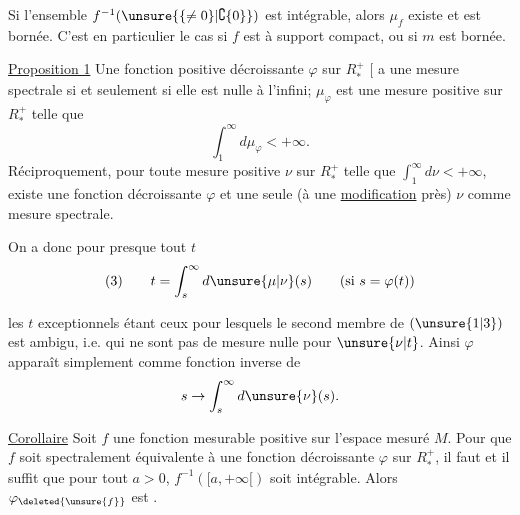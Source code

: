  Si l'ensemble \(f^{-1}(\unsure{\{\ne0\}|\complement\{0\}})\) est intégrable, alors \(\mu_f\) existe et est bornée. C'est en particulier le cas si \(f\) est à support compact, ou si \(m\) est bornée.
\inserted{\unsure{Autre cas : toute} \(f\in C_0(M)\), \unsure{plus généralement telle} que, \deleted{\(\unsure{\varepsilon}\)} pour tout \(\varepsilon\), \(|f|^{-1}(]\varepsilon,\infty[)\) est intégrable.}

\uline{Proposition 1}  Une fonction positive décroissante \(\varphi\) sur \(R_*^+\) \(\bigl[\) a une mesure spectrale si et seulement si elle est nulle à l'infini; \(\mu_\varphi\) est une mesure positive sur \(R_*^+\) telle que
\[
\int_1^\infty d\mu_\varphi<+\infty.
\]
Réciproquement, pour toute mesure positive \(\nu\) sur \(R_*^+\) telle que \(\int_1^\infty d\nu<+\infty\), existe une fonction  décroissante \(\varphi\) et une seule (à une \uline{modification}  près)  \(\nu\) comme mesure spectrale.

On a donc pour presque tout \(t\)
\[
(3)\qquad t=\int_s^\infty d\unsure{\mu|\nu}(s)\qquad(\text{si }s=\varphi(t))
\]


les \(t\) exceptionnels étant ceux pour lesquels le second membre de \((\unsure{1|3})\) est ambigu, i.e. qui ne sont pas de mesure nulle pour \(\unsure{\nu|t}\). Ainsi \(\varphi\) apparaît simplement comme fonction inverse de
\[
s\to\int_s^\infty d\unsure{\nu}(s).
\]

\uline{Corollaire} Soit \(f\) une fonction mesurable positive sur l'espace mesuré \(M\). Pour que \(f\) soit spectralement équivalente à une fonction décroissante \(\varphi\) sur \(R_*^+\), il faut et il suffit que pour tout \(a>0\), \(f^{-1}([a,+\infty[)\) soit intégrable. Alors \(\varphi_{\deleted{\unsure{f}}}\) est  .

